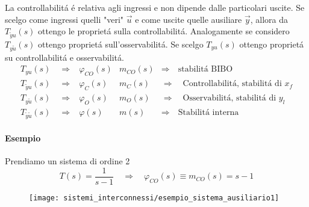 \documentclass[../main.tex]{subfiles}
\begin{document}
		La controllabilit\'a \'e relativa agli ingressi e non dipende dalle particolari uscite. Se scelgo come ingressi quelli "veri" $ \vec u $ e come uscite quelle ausiliare $ \vec y $, allora da $ T_{\tilde y u}(s) $ ottengo le propriet\'a sulla controllabilit\'a. Analogamente se considero $ T_{y \tilde u}(s) $ ottengo propriet\'a sull'osservabilit\'a. Se scelgo $ T_{yu}(s) $ ottengo propriet\'a su controllabilit\'a e osservabilit\'a.
		\[
			\begin{array}{llll}
				T_{yu}(s) \quad\Rightarrow & \varphi_{CO}(s) & m_{CO}(s) & \Rightarrow\quad \text{stabilit\'a BIBO}
				\\ 
				T_{\tilde y u}(s) \quad\Rightarrow & \varphi_C(s) & m_C(s) & \Rightarrow\quad \text{Controllabilit\'a, stabilit\'a di } x_f
				\\ 
				T_{y \tilde u}(s) \quad\Rightarrow & \varphi_O(s) & m_O(s) & \Rightarrow\quad \text{Osservabilit\'a, stabilit\'a di } y_l
				\\ 
				T_{\tilde y \tilde u}(s) \quad\Rightarrow & \varphi(s) & m(s) & \Rightarrow\quad \text{Stabilit\'a interna}
			\end{array}
		\]
		
		\paragraph{Esempio}
			Prendiamo un sistema di ordine 2
			\[
			T(s) = \dfrac{1}{s-1} \quad\Rightarrow\quad \varphi_{CO}(s) \equiv m_{CO}(s) = s-1
			\]
			\begin{figure}[H]
				\centering\texttt{[image: sistemi\_interconnessi/esempio\_sistema\_ausiliario1]}
			\end{figure}
			
\end{document}
